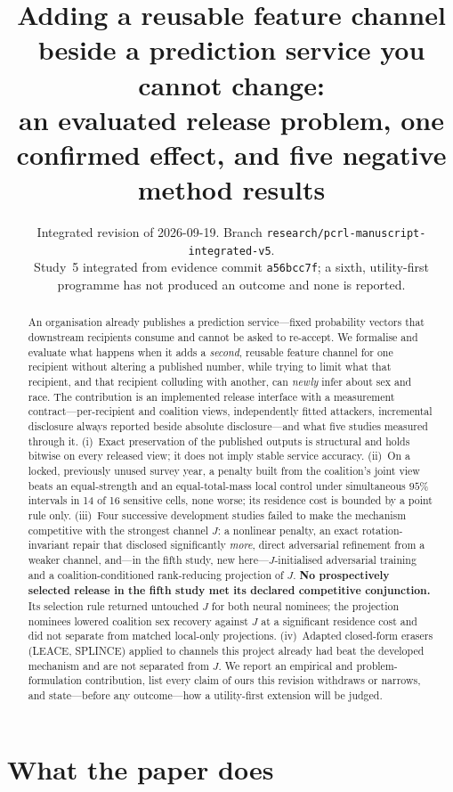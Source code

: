 \documentclass[10pt]{article}
\title{Adding a reusable feature channel beside a prediction service you cannot change:\\
an evaluated release problem, one confirmed effect, and five negative method results}
\author{}
\date{Integrated revision of 2026-09-19.
Branch \texttt{research/pcrl-manuscript-integrated-v5}.\\
\small Study~5 integrated from evidence commit \texttt{a56bcc7f}; a sixth, utility-first programme has
not produced an outcome and none is reported.}
\begin{document}
\maketitle

\begin{abstract}
An organisation already publishes a prediction service---fixed probability vectors that downstream
recipients consume and cannot be asked to re-accept. We formalise and evaluate what happens when it
adds a \emph{second}, reusable feature channel for one recipient without altering a published number,
while trying to limit what that recipient, and that recipient colluding with another, can \emph{newly}
infer about sex and race. The contribution is an implemented release interface with a measurement
contract---per-recipient and coalition views, independently fitted attackers, incremental disclosure
always reported beside absolute disclosure---and what five studies measured through it. (i)~Exact
preservation of the published outputs is structural and holds bitwise on every released view; it does
not imply stable service accuracy. (ii)~On a locked, previously unused survey year, a penalty built from
the coalition's joint view beats an equal-strength and an equal-total-mass local control under
simultaneous $95\%$ intervals in 14 of 16 sensitive cells, none worse; its residence cost is bounded by
a point rule only. (iii)~Four successive development studies failed to make the mechanism competitive
with the strongest channel $J$: a nonlinear penalty, an exact rotation-invariant repair that disclosed
significantly \emph{more}, direct adversarial refinement from a weaker channel, and---in the fifth
study, new here---$J$-initialised adversarial training and a coalition-conditioned rank-reducing
projection of $J$. \textbf{No prospectively selected release in the fifth study met its declared
competitive conjunction.} Its selection rule returned untouched $J$ for both neural nominees; the
projection nominees lowered coalition sex recovery against $J$ at a significant residence cost and did
not separate from matched local-only projections. (iv)~Adapted closed-form erasers (LEACE, SPLINCE)
applied to channels this project already had beat the developed mechanism and are not separated from
$J$. We report an empirical and problem-formulation contribution, list every claim of ours this
revision withdraws or narrows, and state---before any outcome---how a utility-first extension will be
judged.
\end{abstract}

\section{What the paper does}
\label{sec:contribution}
\end{document}
